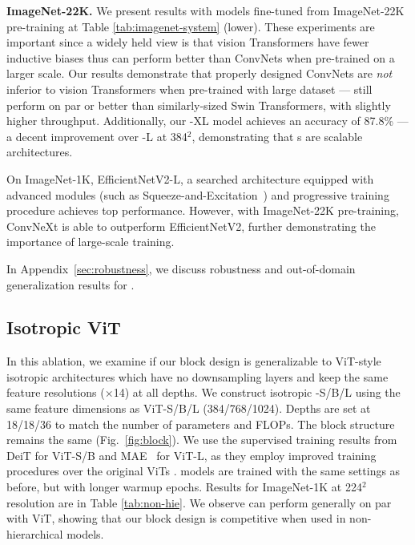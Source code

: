 \documentclass[10pt,twocolumn,letterpaper]{article}
\renewcommand{\paragraph}[1]{\vspace{1.25mm}\noindent\textbf{#1}}
\begin{document}
\paragraph{ImageNet-22K.}
We present results with models fine-tuned from ImageNet-22K pre-training at Table \ref{tab:imagenet-system} (lower). 
These experiments are important since a widely held view is that vision Transformers have fewer inductive biases thus can perform better than ConvNets when pre-trained on a larger scale. 
 Our results demonstrate that properly designed ConvNets are \emph{not} inferior to vision Transformers when pre-trained with large dataset ---  still perform on par or better than similarly-sized Swin Transformers, with slightly higher throughput. Additionally, our \cnn{}-XL model achieves an accuracy of 87.8\% --- a decent improvement over \cnn{}-L at 384$^2$, demonstrating that \cnn{}s are scalable architectures. 
 
On ImageNet-1K, EfficientNetV2-L, a searched architecture equipped with advanced modules (such as Squeeze-and-Excitation~\cite{hu2018squeeze}) and progressive training procedure achieves top performance. However, with ImageNet-22K pre-training, ConvNeXt is able to outperform EfficientNetV2, further demonstrating the importance of large-scale training.

In Appendix~\ref{sec:robustness}, we discuss robustness and out-of-domain generalization results for \cnn{}.

\subsection{Isotropic \cnn{} \vs ViT}
\label{subsec:isotropic} 
In this ablation, we examine if our \cnn{} block design is generalizable to ViT-style~\cite{Dosovitskiy2021} isotropic architectures which have no downsampling layers and keep the same feature resolutions ($\times$14) at all depths. We construct isotropic \cnn{}-S/B/L using the same feature dimensions as ViT-S/B/L (384/768/1024). Depths are set at 18/18/36 to match the number of parameters and FLOPs. The block structure remains the same (Fig.~\ref{fig:block}).
We use the supervised training results from DeiT \cite{Touvron2020} for ViT-S/B and MAE~\cite{he2021masked} for ViT-L, as they employ improved training procedures over the original ViTs \cite{Dosovitskiy2021}. \cnn{} models are trained with the same settings as before, but with longer warmup epochs. Results for ImageNet-1K at 224$^2$ resolution are in Table \ref{tab:non-hie}. We observe \cnn{} can perform generally on par with ViT, showing that our \cnn{} block design is competitive when used in non-hierarchical models. 
\end{document}
